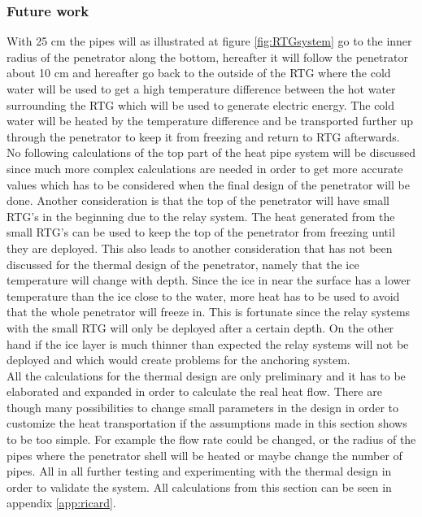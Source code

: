 \subsubsection{Future work}
With 25 cm the pipes will as illustrated at figure \ref{fig:RTGsystem} go to the inner radius of the penetrator along the bottom, hereafter it will follow the penetrator about 10 cm and hereafter go back to the outside of the RTG where the cold water will be used to get a high temperature difference between the hot water surrounding the RTG which will be used to generate electric energy. The cold water will be heated by the temperature difference and be transported further up through the penetrator to keep it from freezing and return to RTG afterwards. No following calculations of the top part of the heat pipe system will be discussed since much more complex calculations are needed in order to get more accurate values which has to be considered when the final design of the penetrator will be done. Another consideration is that the top of the penetrator will have small RTG's in the beginning due to the relay system. The heat generated from the small RTG's can be used to keep the top of the penetrator from freezing until they are deployed. This also leads to another consideration that has not been discussed for the thermal design of the penetrator, namely that the ice temperature will change with depth. Since the ice in near the surface has a lower temperature than the ice close to the water, more heat has to be used to avoid that the whole penetrator will freeze in. This is fortunate since the relay systems with the small RTG will only be deployed after a certain depth. On the other hand if the ice layer is much thinner than expected the relay systems will not be deployed and which would create problems for the anchoring system.\\
 
\noindent
All the calculations for the thermal design are only preliminary and it has to be elaborated and expanded in order to calculate the real heat flow. There are though many possibilities to change small parameters in the design in order to customize the heat transportation if the assumptions made in this section shows to be too simple. For example the flow rate could be changed, or the radius of the pipes where the penetrator shell will be heated or maybe change the number of pipes. All in all further testing and experimenting with the thermal design in order to validate the system. All calculations from this section can be seen in appendix \ref{app:ricard}. 

